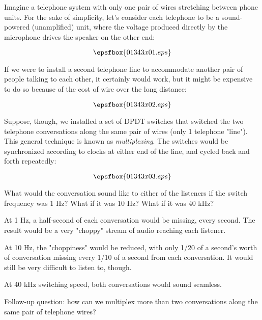

Imagine a telephone system with only one pair of wires stretching between phone units.  For the sake of simplicity, let's consider each telephone to be a sound-powered (unamplified) unit, where the voltage produced directly by the microphone drives the speaker on the other end:

$$\epsfbox{01343x01.eps}$$

If we were to install a second telephone line to accommodate another pair of people talking to each other, it certainly would work, but it might be expensive to do so because of the cost of wire over the long distance:

$$\epsfbox{01343x02.eps}$$

Suppose, though, we installed a set of DPDT switches that switched the two telephone conversations along the same pair of wires (only 1 telephone "line").  This general technique is known as {\it multiplexing}.  The switches would be synchronized according to clocks at either end of the line, and cycled back and forth repeatedly:

$$\epsfbox{01343x03.eps}$$

What would the conversation sound like to either of the listeners if the switch frequency was 1 Hz?  What if it was 10 Hz?  What if it was 40 kHz?







At 1 Hz, a half-second of each conversation would be missing, every second.  The result would be a very "choppy" stream of audio reaching each listener.

\vskip 10pt

At 10 Hz, the "choppiness" would be reduced, with only 1/20 of a second's worth of conversation missing every 1/10 of a second from each conversation.  It would still be very difficult to listen to, though.

\vskip 10pt

At 40 kHz switching speed, both conversations would sound seamless.

\vskip 10pt

Follow-up question: how can we multiplex more than two conversations along the same pair of telephone wires?


